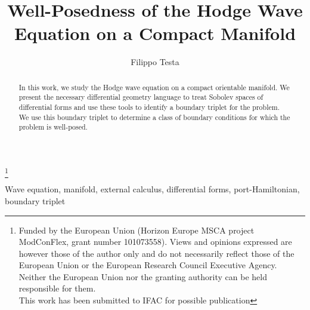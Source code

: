 \documentclass{ifacconf}
\begin{document}
\begin{frontmatter}

\title{Well-Posedness of the Hodge Wave Equation on a Compact Manifold } 

\thanks[footnoteinfo]{Funded by the European Union (Horizon Europe MSCA project ModConFlex, grant number
101073558). Views and opinions expressed are however those of the author only and do
not necessarily reflect those of the European Union or the European Research Council
Executive Agency. Neither the European Union nor the granting authority can be held
responsible for them.\\
This work has been submitted to IFAC for possible publication}

\author[First]{Filippo Testa} 

\address[First]{Department of Applied Mathematics, University of Twente, 
   Enschede, The Netherlands (e-mail: f.testa@utwente.nl).}

\begin{abstract}           
    In this work, we study the Hodge wave equation on a compact orientable manifold. We present the necessary differential geometry language to treat Sobolev spaces of differential forms and use these tools to identify a boundary triplet for the problem.
    We use this boundary triplet to determine a class of boundary conditions for which the problem is well-posed.
\end{abstract}

\begin{keyword}
Wave equation, manifold, external calculus, differential forms, port-Hamiltonian, boundary triplet
\end{keyword}

\end{frontmatter}
\end{document}
